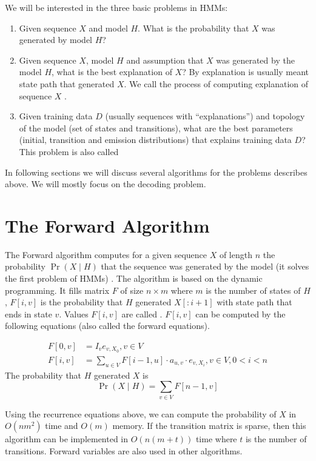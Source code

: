 We will be interested in the three basic problems in HMMs:
\begin{enumerate}
\item Given sequence $X$ and model $H$. What is the probability that $X$ was
generated by model $H$?
\item Given sequence $X$, model $H$ and assumption that $X$ was generated by the
model
$H$, what is the best explanation of $X$? By explanation is usually meant state
path that generated $X$. We call the process of computing explanation of
sequence $X$ .
\item Given training data $D$ (usually sequences with ``explanations'') and
topology of the model (set of states and transitions), what are the best parameters
(initial, transition and emission distributions) that explains training
data $D$? This problem is also called 
\end{enumerate} 
In following sections we will discuss several algorithms
for the problems describes above. We will mostly focus on the
decoding problem.


\section{The Forward Algorithm}
The Forward algorithm computes for a given sequence $X$ of
length $n$ the probability $\Pr\left(X\mid H\right)$ that the sequence was
generated by the model (it solves the first problem of HMMs) \cite{Durbin1998}. The algorithm is
based on the dynamic programming. It fills
matrix $F$ of size $n\times m$ where $m$ is the number of states of $H$, $F[i,v]$ is the probability that $H$
generated $X[:i+1]$ with state path that ends in state $v$. Values $F[i,v]$ are  called . $F[i,v]$ can be computed by the following equations (also called the
forward equations).

\begin{align}
F[0,v] &= I_ve_{v,X_0}, v\in V\\
F[i,v] &= \sum_{u\in V}F[i-1,u] \cdot a_{u,v} \cdot e_{v,X_i}, v\in V,0< i < n
\end{align}
The probability that $H$ generated $X$ is 
 \[\Pr\left(X\mid H\right) = \sum_{v\in V} F[n-1,v]\]

Using the recurrence equations above, we can compute the probability of $X$ in
$O(nm^2)$ time and $O(m)$ memory. If the transition
matrix is sparse, then this algorithm can be implemented in $O(n(m+t))$ time
where $t$ is the number of transitions.  Forward variables are also used in other
algorithms. 

